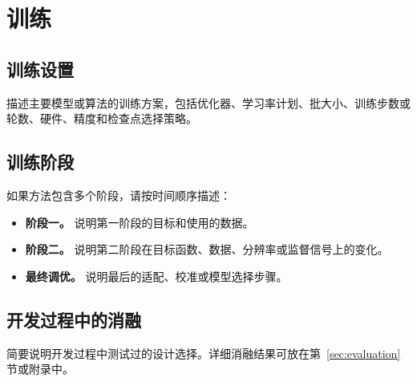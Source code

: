 \section{训练}

\subsection{训练设置}

描述主要模型或算法的训练方案，包括优化器、学习率计划、批大小、训练步数或轮数、硬件、精度和检查点选择策略。

\subsection{训练阶段}

如果方法包含多个阶段，请按时间顺序描述：
\begin{itemize}
  \item \textbf{阶段一。} 说明第一阶段的目标和使用的数据。
  \item \textbf{阶段二。} 说明第二阶段在目标函数、数据、分辨率或监督信号上的变化。
  \item \textbf{最终调优。} 说明最后的适配、校准或模型选择步骤。
\end{itemize}

\subsection{开发过程中的消融}

简要说明开发过程中测试过的设计选择。详细消融结果可放在第~\ref{sec:evaluation} 节或附录中。
